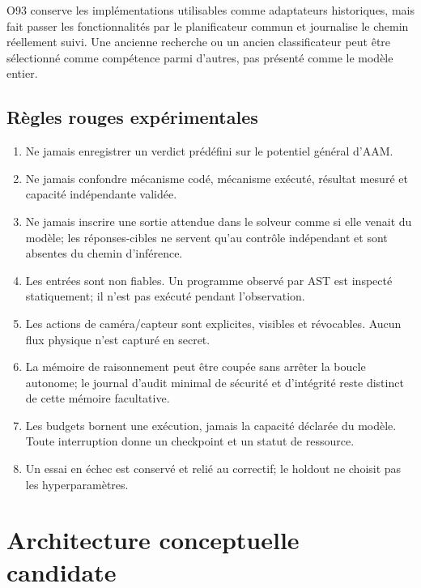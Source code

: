 \documentclass[11pt,a4paper,oneside]{report}
\begin{document}
O93 conserve les implémentations utilisables comme adaptateurs historiques, mais fait passer les fonctionnalités par le planificateur commun et journalise le chemin réellement suivi. Une ancienne recherche ou un ancien classificateur peut être sélectionné comme compétence parmi d'autres, pas présenté comme le modèle entier.

\section{Règles rouges expérimentales}
\begin{enumerate}
\item Ne jamais enregistrer un verdict prédéfini sur le potentiel général d'AAM.
\item Ne jamais confondre mécanisme codé, mécanisme exécuté, résultat mesuré et capacité indépendante validée.
\item Ne jamais inscrire une sortie attendue dans le solveur comme si elle venait du modèle; les réponses-cibles ne servent qu'au contrôle indépendant et sont absentes du chemin d'inférence.
\item Les entrées sont non fiables. Un programme observé par AST est inspecté statiquement; il n'est pas exécuté pendant l'observation.
\item Les actions de caméra/capteur sont explicites, visibles et révocables. Aucun flux physique n'est capturé en secret.
\item La mémoire de raisonnement peut être coupée sans arrêter la boucle autonome; le journal d'audit minimal de sécurité et d'intégrité reste distinct de cette mémoire facultative.
\item Les budgets bornent une exécution, jamais la capacité déclarée du modèle. Toute interruption donne un checkpoint et un statut de ressource.
\item Un essai en échec est conservé et relié au correctif; le holdout ne choisit pas les hyperparamètres.
\end{enumerate}

\chapter{Architecture conceptuelle candidate}
\end{document}
